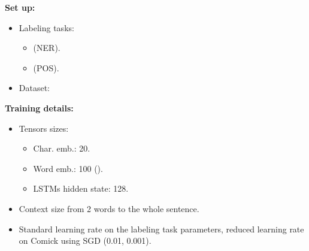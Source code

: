 \textbf{Set up:}
\begin{itemize}
  \item Labeling tasks:
  \begin{itemize}
      \item {} (NER).
      \item {} (POS).
  \end{itemize}
  \item Dataset: 
  
\end{itemize}

\textbf{Training details:}
\begin{itemize}
    \item Tensors sizes:
    \begin{itemize}
        \item Char. emb.: 20.
        \item Word emb.: 100 ().
        \item LSTMs hidden state: 128.
    \end{itemize}
    \item Context size from 2 words to the whole sentence.
    \item Standard learning rate on the labeling task parameters, reduced learning rate on Comick using SGD (0.01, 0.001).
\end{itemize}

\vspace{-.25mm}